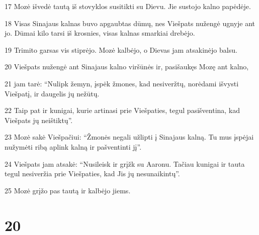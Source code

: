 \par 17 Mozė išvedė tautą iš stovyklos susitikti su Dievu. Jie sustojo kalno papėdėje. 
\par 18 Visas Sinajaus kalnas buvo apgaubtas dūmų, nes Viešpats nužengė ugnyje ant jo. Dūmai kilo tarsi iš krosnies, visas kalnas smarkiai drebėjo. 
\par 19 Trimito garsas vis stiprėjo. Mozė kalbėjo, o Dievas jam atsakinėjo balsu. 
\par 20 Viešpats nužengė ant Sinajaus kalno viršūnės ir, pasišaukęs Mozę ant kalno, 
\par 21 jam tarė: “Nulipk žemyn, įspėk žmones, kad nesiveržtų, norėdami išvysti Viešpatį, ir daugelis jų nežūtų. 
\par 22 Taip pat ir kunigai, kurie artinasi prie Viešpaties, tegul pasišventina, kad Viešpats jų neištiktų”. 
\par 23 Mozė sakė Viešpačiui: “Žmonės negali užlipti į Sinajaus kalną. Tu mus įspėjai nužymėti ribą aplink kalną ir pašventinti jį”. 
\par 24 Viešpats jam atsakė: “Nusileisk ir grįžk su Aaronu. Tačiau kunigai ir tauta tegul nesiveržia prie Viešpaties, kad Jis jų nesunaikintų”. 
\par 25 Mozė grįžo pas tautą ir kalbėjo jiems.



\chapter{20}

